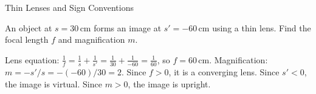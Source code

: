 \begin{KnowledgePoint}{Thin Lenses and Sign Conventions \Core}
  \KPProblems
  \begin{center}
  \end{center}
\begin{cheatproblem}
  An object at $s=30\,\text{cm}$ forms an image at $s'=-60\,\text{cm}$ using a thin lens. Find the focal length $f$ and magnification $m$.
  \begin{solutionbox}
  Lens equation: $\tfrac{1}{f}=\tfrac{1}{s}+\tfrac{1}{s'}=\tfrac{1}{30}+\tfrac{1}{-60}=\tfrac{1}{60}$, so $f=60\,\text{cm}$.
  Magnification: $m=-s'/s = -(-60)/30=2$.
  Since $f>0$, it is a converging lens. Since $s'<0$, the image is virtual. Since $m>0$, the image is upright.
  \end{solutionbox}
  \end{cheatproblem}
\end{KnowledgePoint}

